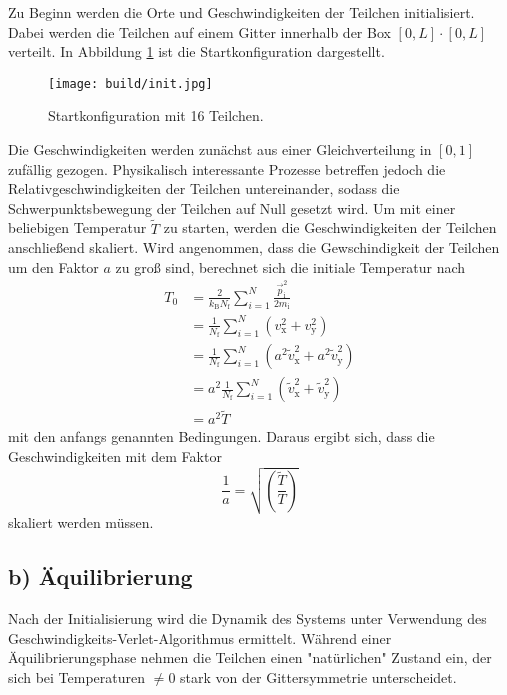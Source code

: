 Zu Beginn werden die Orte und Geschwindigkeiten der Teilchen initialisiert.
Dabei werden die Teilchen auf einem Gitter innerhalb der Box $[0,L] \cdot [0,L]$ verteilt.
In Abbildung \ref{fig:init} ist die Startkonfiguration dargestellt.
\begin{figure}
    \centering
    \texttt{[image: build/init.jpg]}
    \caption{Startkonfiguration mit 16 Teilchen.}
    \label{fig:init}
\end{figure}
Die Geschwindigkeiten werden zunächst aus einer Gleichverteilung in $[0,1]$ zufällig
gezogen. Physikalisch interessante Prozesse betreffen jedoch die Relativgeschwindigkeiten
der Teilchen untereinander, sodass die Schwerpunktsbewegung der Teilchen auf
Null gesetzt wird.
Um mit einer beliebigen Temperatur $\tilde{T}$ zu starten, werden die Geschwindigkeiten der
Teilchen anschließend skaliert. Wird angenommen, dass die Gewschindigkeit der Teilchen
um den Faktor $a$ zu groß sind, berechnet sich die initiale Temperatur nach
\begin{align*}
    T_0 &=
    \frac{2}{k_\text{B} N_\text{f}} \sum_{i=1}^N \frac{\vec{p}_\text{i}^2}{2 m_\text{i}} \\
    &= \frac{1}{N_\text{f}} \sum_{i=1}^N \left(v_\text{x}^2 + v_\text{y}^2\right) \\
    &= \frac{1}{N_\text{f}} \sum_{i=1}^N
        \left(a^2 \tilde{v}_\text{x}^2 + a^2 \tilde{v}_\text{y}^2\right) \\
    &= a^2 \frac{1}{N_\text{f}} \sum_{i=1}^N
        \left(\tilde{v}_\text{x}^2 + \tilde{v}_\text{y}^2\right) \\
    &= a^2 \tilde{T}
\end{align*}
mit den anfangs genannten Bedingungen.
Daraus ergibt sich, dass die Geschwindigkeiten mit dem Faktor
\begin{equation*}
    \frac{1}{a} = \sqrt{\!\left(\frac{\tilde{T}}{T}\right)}
\end{equation*}
skaliert werden müssen.

\FloatBarrier
\subsection*{b) Äquilibrierung}

Nach der Initialisierung wird die Dynamik des Systems unter Verwendung des
Geschwindigkeits-Verlet-Algorithmus ermittelt.
Während einer Äquilibrierungsphase nehmen die Teilchen einen "natürlichen" Zustand ein,
der sich bei Temperaturen $\neq 0$ stark von der Gittersymmetrie unterscheidet.

